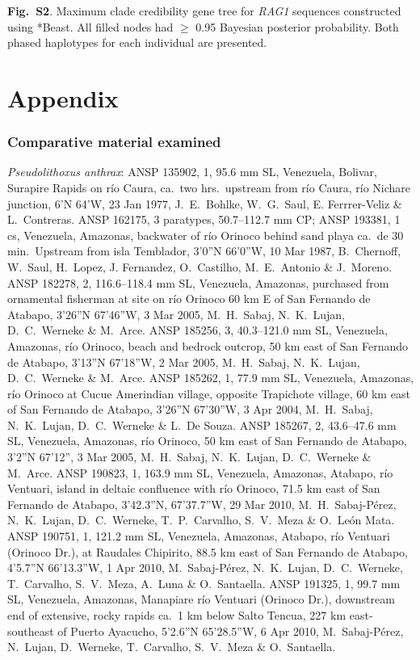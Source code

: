 \documentclass[12pt]{article}
\begin{document}
\noindent \textbf{Fig.\ S2}. Maximum clade credibility gene tree for \emph{RAG1} sequences constructed using *Beast. %
All filled nodes had $\geq$ 0.95 Bayesian posterior probability. %
Both phased haplotypes for each individual are presented.%
\bigskip
\newpage 

\section*{Appendix}
\subsubsection*{Comparative material examined}

\noindent \emph{Pseudolithoxus anthrax}: ANSP 135902, 1, 95.6 mm SL, Venezuela, Bolivar, Surapire Rapids on río Caura, ca.\ two hrs.\ upstream from río Caura, río Nichare junction, 6’N 64’W, 23 Jan 1977, J.\ E.\ Bohlke, W.\ G.\ Saul, E. Ferrrer-Veliz \& L.\ Contreras. %
ANSP 162175, 3 paratypes, 50.7--112.7 mm CP; ANSP 193381, 1 cs, Venezuela, Amazonas, backwater of río Orinoco behind sand playa ca.\ de 30 min.\ Upstream from isla Temblador, 3’0”N 66’0”W, 10 Mar 1987, B.\ Chernoff, W.\ Saul, H.\ Lopez, J. Fernandez, O.\ Castilho, M.\ E.\ Antonio \& J.\ Moreno. %
ANSP 182278, 2, 116.6--118.4 mm SL, Venezuela, Amazonas, purchased from ornamental fisherman at site on río Orinoco 60 km E of San Fernando de Atabapo, 3’26”N 67’46”W, 3 Mar 2005, M.\ H.\ Sabaj, N.\ K.\ Lujan, D.\ C.\ Werneke \& M.\ Arce. %
ANSP 185256, 3, 40.3--121.0 mm SL, Venezuela, Amazonas, río Orinoco, beach and bedrock outcrop, 50 km east of San Fernando de Atabapo, 3’13”N 67’18”W, 2 Mar 2005, M.\ H.\ Sabaj, N.\ K.\ Lujan, D.\ C.\ Werneke \& M.\ Arce. %
ANSP 185262, 1, 77.9 mm SL, Venezuela, Amazonas, río Orinoco at Cucue Amerindian village, opposite Trapichote village, 60 km east of San Fernando de Atabapo, 3’26”N 67’30”W, 3 Apr 2004, M.\ H.\ Sabaj, N.\ K.\ Lujan, D.\ C.\ Werneke \& L.\ De Souza. %
ANSP 185267, 2, 43.6--47.6 mm SL, Venezuela, Amazonas, río Orinoco, 50 km east of San Fernando de Atabapo, 3’2”N 67’12”, 3 Mar 2005, M.\ H.\ Sabaj, N.\ K.\ Lujan, D.\ C.\ Werneke \& M.\ Arce. %
ANSP 190823, 1, 163.9 mm SL, Venezuela, Amazonas, Atabapo, río Ventuari, island in deltaic confluence with río Orinoco, 71.5 km east of San Fernando de Atabapo, 3’42.3”N, 67’37.7”W, 29 Mar 2010, M.\ H.\ Sabaj-Pérez, N.\ K.\ Lujan, D.\ C.\ Werneke, T.\ P.\ Carvalho, S.\ V.\ Meza \& O.\ León Mata. %
ANSP 190751, 1, 121.2 mm SL, Venezuela, Amazonas, Atabapo, río Ventuari (Orinoco Dr.), at Raudales Chipirito, 88.5 km east of San Fernando de Atabapo, 4’5.7”N 66’13.3”W, 1 Apr 2010, M.\ Sabaj-Pérez, N.\ K.\ Lujan, D.\ C.\ Werneke, T.\ Carvalho, S.\ V.\ Meza, A.\ Luna \& O.\ Santaella. %
ANSP 191325, 1, 99.7 mm SL, Venezuela, Amazonas, Manapiare río Ventuari (Orinoco Dr.), downstream end of extensive, rocky rapids ca.\ 1 km below Salto Tencua, 227 km east-southeast of Puerto Ayacucho, 5’2.6”N 65’28.5”W, 6 Apr 2010, M.\ Sabaj-Pérez, N.\ Lujan, D.\ Werneke, T.\ Carvalho, S.\ V.\ Meza \& O.\ Santaella.\\%
\bigskip
\end{document}
